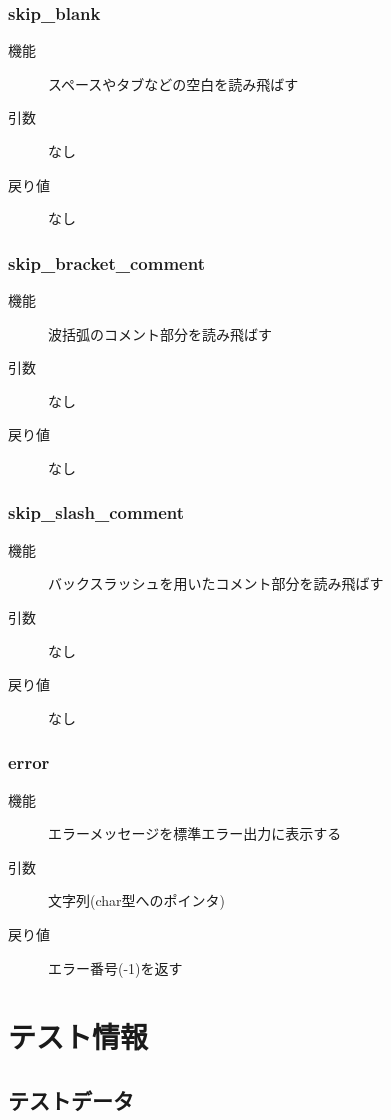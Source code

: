 \documentclass{jlreq}
\begin{document}
\subsubsection{skip\_blank}
\begin{description}
  \item[機能] スペースやタブなどの空白を読み飛ばす
  \item[引数] なし
  \item[戻り値] なし
\end{description}

\subsubsection{skip\_bracket\_comment}
\begin{description}
  \item[機能] 波括弧のコメント部分を読み飛ばす
  \item[引数] なし
  \item[戻り値] なし
\end{description}

\subsubsection{skip\_slash\_comment}
\begin{description}
  \item[機能] バックスラッシュを用いたコメント部分を読み飛ばす
  \item[引数] なし
  \item[戻り値] なし
\end{description}

\subsubsection{error}
\begin{description}
  \item[機能] エラーメッセージを標準エラー出力に表示する
  \item[引数] 文字列(char型へのポインタ)
  \item[戻り値] エラー番号(-1)を返す
\end{description}

\section{テスト情報}

\subsection{テストデータ}
\end{document}
